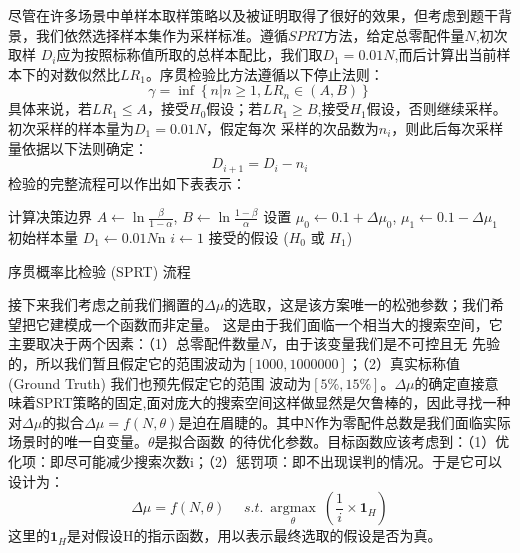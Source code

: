 \documentclass[withoutpreface,bwprint]{cumcmthesis} %
\begin{document}
尽管在许多场景中单样本取样策略以及被证明取得了很好的效果，但考虑到题干背景，我们依然选择样本集作为采样标准。遵循$SPRT$方法，给定总零配件量$N$,初次取样
$D_i$应为按照标称值所取的总样本配比，我们取$D_1=0.01N$,而后计算出当前样本下的对数似然比$LR_1$。序贯检验比方法遵循以下停止法则：
\begin{equation}
	\gamma = \inf \left\{ n | n \geq 1, LR_n \in (A, B) \right\}
\end{equation}
具体来说，若$LR_1 \le A$，接受$H_0$假设；若$LR_1 \ge B$,接受$H_1$假设，否则继续采样。初次采样的样本量为$D_1=0.01N$，假定每次
采样的次品数为$n_i$，则此后每次采样量依据以下法则确定：
\begin{equation}
	D_{i+1}=D_i-n_i
\end{equation}
检验的完整流程可以作出如下表表示：

\begin{adjustbox}{width=16cm,height=6.5cm}
	\centering
	\begin{algorithm}[H]
		\SetAlgoLined
		计算决策边界 $A \gets \ln \frac{\beta}{1 - \alpha}$, $B \gets \ln \frac{1 - \beta}{\alpha}$\;
		设置 $\mu_0 \gets 0.1 + \Delta \mu_0$, $\mu_1 \gets 0.1 - \Delta \mu_1$\;
		初始样本量 $D_1 \gets 0.01N$n\;
		$i \gets 1$\;
		\Return 接受的假设 ($H_0$ 或 $H_1$)
		\label{alg:sprt}
		\caption{序贯概率比检验 (SPRT) 流程}
	\end{algorithm}
\end{adjustbox}

接下来我们考虑之前我们搁置的$\Delta \mu$的选取，这是该方案唯一的松弛参数；我们希望把它建模成一个函数而非定量。
这是由于我们面临一个相当大的搜索空间，它主要取决于两个因素：（1）总零配件数量$N$，由于该变量我们是不可控且无
先验的，所以我们暂且假定它的范围波动为$[1000,1000000]$；（2）真实标称值(Ground Truth) 我们也预先假定它的范围
波动为$[5\%,15\%]$。$\Delta \mu$的确定直接意味着SPRT策略的固定,面对庞大的搜索空间这样做显然是欠鲁棒的，因此寻找一种
对$\Delta \mu$的拟合$\Delta \mu = f(N,\theta)$是迫在眉睫的。其中N作为零配件总数是我们面临实际场景时的唯一自变量。$\theta$是拟合函数
的待优化参数。目标函数应该考虑到：（1）优化项：即尽可能减少搜索次数i；（2）惩罚项：即不出现误判的情况。于是它可以设计为：
\begin{equation}
	\Delta \mu = f(N,\theta) \ \ \ \ \ \ s.t. \ \underset{\theta}{\operatorname{argmax}} \ (\frac{1}{i} \times \mathbf{1}_H)
\end{equation}
这里的$\mathbf{1}_H$是对假设H的指示函数，用以表示最终选取的假设是否为真。
\end{document}

